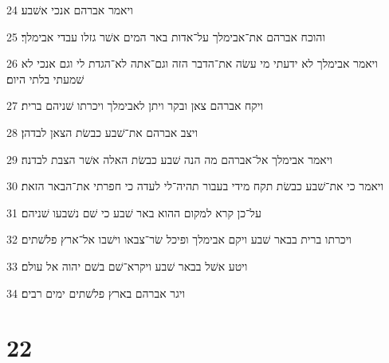 \par 24 ויאמר אברהם אנכי אשׁבע׃
\par 25 והוכח אברהם את־אבימלך על־אדות באר המים אשׁר גזלו עבדי אבימלך׃
\par 26 ויאמר אבימלך לא ידעתי מי עשׂה את־הדבר הזה וגם־אתה לא־הגדת לי וגם אנכי לא שׁמעתי בלתי היום׃
\par 27 ויקח אברהם צאן ובקר ויתן לאבימלך ויכרתו שׁניהם ברית׃
\par 28 ויצב אברהם את־שׁבע כבשׂת הצאן לבדהן׃
\par 29 ויאמר אבימלך אל־אברהם מה הנה שׁבע כבשׂת האלה אשׁר הצבת לבדנה׃
\par 30 ויאמר כי את־שׁבע כבשׂת תקח מידי בעבור תהיה־לי לעדה כי חפרתי את־הבאר הזאת׃
\par 31 על־כן קרא למקום ההוא באר שׁבע כי שׁם נשׁבעו שׁניהם׃
\par 32 ויכרתו ברית בבאר שׁבע ויקם אבימלך ופיכל שׂר־צבאו וישׁבו אל־ארץ פלשׁתים׃
\par 33 ויטע אשׁל בבאר שׁבע ויקרא־שׁם בשׁם יהוה אל עולם׃
\par 34 ויגר אברהם בארץ פלשׁתים ימים רבים׃

\chapter{22}

